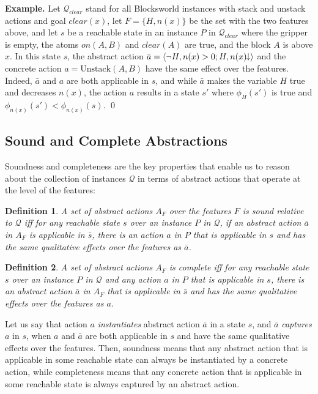 \documentclass[letterpaper]{article} %
\newcommand{\tup}[1]{\langle #1 \rangle}
\newtheorem{definition}{Definition}
\newenvironment{example}{\noindent\textbf{Example.}\xspace}{\qed}
\newcommand{\Q}{\mathcal{Q}}
\newcommand{\abst}[2]{\tup{#1;#2}}
\newcommand{\mminus}{\hspace{-.05em}\raisebox{.15ex}{\footnotesize$\downarrow$}}
\begin{document}
\medskip
\begin{example}
Let $\Q_{clear}$ stand for  all  Blocksworld instances with stack and unstack actions and goal $clear(x)$,
let $F=\{H,n(x)\}$ be the set with the two features above, and let $s$ be a reachable state in an instance $P$
in $\Q_{clear}$
where the gripper is empty, the atoms $on(A,B)$ and $clear(A)$ are true, and the block $A$ is above $x$.
In this state $s$,
the abstract action $\bar{a}=\abst{\neg H,n(x)>0}{H,n(x)\mminus}$
and the concrete  action  $a=\text{Unstack}(A,B)$ have the same effect over the features.
Indeed, $\bar{a}$ and $a$  are both applicable in $s$, and while $\bar{a}$ makes the variable $H$ true and decreases
$n(x)$, the action $a$ results in a state $s'$ where $\phi_{H}(s')$ is true and $\phi_{n(x)}(s') < \phi_{n(x)}(s)$.
\end{example}


\subsection{Sound and Complete Abstractions}

Soundness and completeness are the key  properties that  enable us to reason about the collection of
instances $\Q$ in terms of abstract actions that operate at the level of the features:

\begin{definition}
A set of abstract actions $A_F$ over the features $F$ is \emph{sound} relative to
$\Q$ iff for any reachable state $s$ over an   instance $P$ in $\Q$,
if an abstract action $\bar{a}$ in $A_F$ is applicable in $\bar{s}$,
there is an  action $a$ in $P$ that is applicable in $s$ and
has the \emph{same qualitative effects} over the features as $\bar{a}$.
\end{definition}

\begin{definition}
A set of abstract actions $A_F$ is \emph{complete} iff for any
reachable state $s$ over an instance $P$ in $\Q$ and any  action $a$
in $P$ that is applicable in $s$, there is an abstract action $\bar{a}$ in
$A_F$ that is applicable in $\bar{s}$ and  has the \emph{same qualitative
effects over the features as $a$.}
\end{definition}

Let us say that  action $a$ \emph{instantiates} abstract action $\bar{a}$ in a state $s$,
and $\bar{a}$ \emph{captures} $a$ in $s$,  when $a$ and $\bar{a}$ are both applicable in $s$ and have the same qualitative effects over the features.
Then, soundness means that any abstract action that is applicable in some reachable state can
always be instantiated by a concrete action, while completeness  means that any concrete action that is applicable in some reachable state
is always captured by an abstract action.
\end{document}
